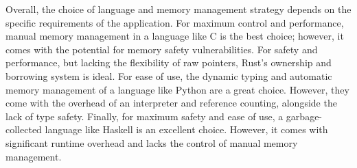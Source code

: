 \documentclass[12pt, letterpaper]{article}
\begin{document}
Overall, the choice of language and memory management strategy depends on the specific requirements of the application. For maximum control and performance, manual memory management in a language like C is the best choice; however, it comes with the potential for memory safety vulnerabilities. For safety and performance, but lacking the flexibility of raw pointers, Rust's ownership and borrowing system is ideal. For ease of use, the dynamic typing and automatic memory management of a language like Python are a great choice. However, they come with the overhead of an interpreter and reference counting, alongside the lack of type safety. Finally, for maximum safety and ease of use, a garbage-collected language like Haskell is an excellent choice. However, it comes with significant runtime overhead and lacks the control of manual memory management.

\newpage

\printbibliography
\end{document}
